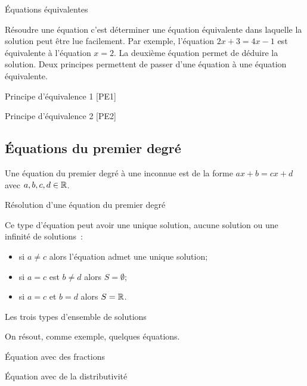 \documentclass[a4paper,12pt]{article}
\begin{document}
\begin{exemple}
	Équations équivalentes
	\tcblower
\vspace{5cm}

\end{exemple}
Résoudre une équation c'est déterminer une équation équivalente dans laquelle la solution peut être lue facilement. Par exemple, l'équation $2x+3=4x-1$ est équivalente à l'équation $x=2$. La deuxième équation permet de déduire la solution. Deux principes permettent de passer d'une équation à une équation équivalente.
\begin{exemple}
	Principe d'équivalence 1 [PE1]
	\tcblower
\vspace{8cm}

\end{exemple}
\begin{exemple}
	Principe d'équivalence 2 [PE2]
	\tcblower
\vspace{8cm}

\end{exemple}
\newpage
\subsection{Équations du premier degré}

Une équation du premier degré à une inconnue est de la forme $ax+b=cx+d$ avec $a,b,c,d\in \mathbb{R}$.
\begin{exemple}
	Résolution d'une équation du premier degré
	\tcblower
\vspace{7cm}

\end{exemple}
Ce type d'équation peut avoir une unique solution, aucune solution ou une infinité de solutions~:
\begin{itemize}
	\item[] si $a\neq c$ alors l'équation admet une unique solution;
	\item[] si $a=c$ est $b\neq d$ alors $S=\emptyset$;
	\item[] si $a=c$ et $b=d$ alors $S=\mathbb{R}$.
\end{itemize}
\begin{exemple}
	Les trois types d'ensemble de solutions
	\tcblower
\vspace{10cm}

\end{exemple}
\newpage
On résout, comme exemple, quelques équations.
\begin{exemple}
	Équation avec des fractions
	\tcblower
\vspace{10cm}

\end{exemple}
\begin{exemple}
	Équation avec de la distributivité
	\tcblower
\vspace{10cm}

\end{exemple}
\newpage
\end{document}
